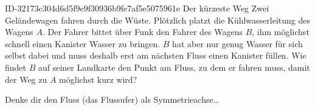 \begin{exercise}
      {ID-32173c304d6d5f9e9f30936b9fe7af5e5075961e}
      {Der kürzeste Weg}
  \ifproblem\problem
    Zwei Geländewagen fahren durch die Wüste. Plötzlich platzt die
    Kühlwasserleitung des Wagens $A$. Der Fahrer bittet über Funk den Fahrer des
    Wagens $B$, ihm möglichst schnell einen Kanister Wasser zu bringen.
    $B$ hat aber nur genug Wasser für sich selbst dabei und muss deshalb erst
    am nächsten Fluss einen Kanister füllen. Wie findet $B$ auf seiner Landkarte
    den Punkt am Fluss, zu dem er fahren muss, damit der Weg zu $A$ möglichst kurz
    wird?
    \begin{center}
    \end{center}
  \fi
  \ifoutline\outline
    Denke dir den Fluss (das Flussufer) als Symmetrieachse\ldots
  \fi
\end{exercise}

